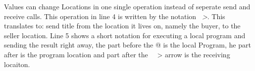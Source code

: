 Values can change Locations in one single operation instead of seperate send and receive calls. This operation in line 4 is written by the notation \emph{~>}. This translates to: send title from the location it lives on, namely the buyer, to the seller location. Line 5 shows a short notation for executing a local program and sending the result right away, the part before the @ is the local Program, he part after is the program location and part after the ~~> arrow is the receiving locaiton.
